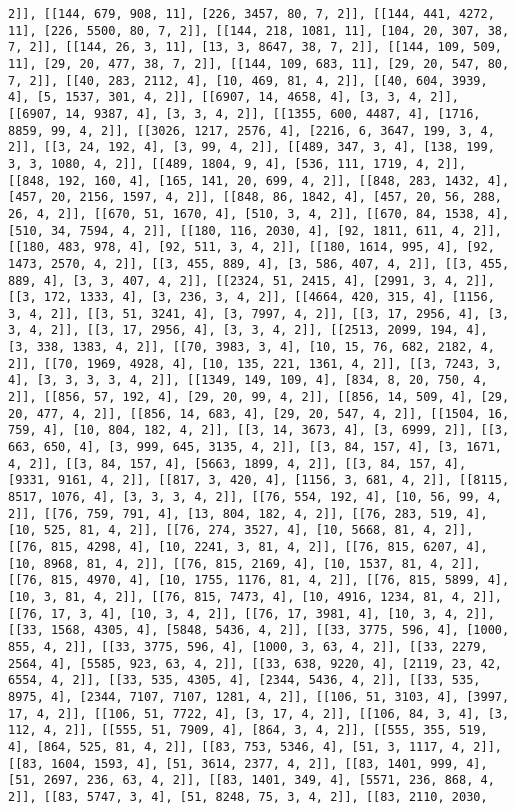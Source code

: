 \documentclass[12pt,fleqn]{article}\usepackage{../../common}
\begin{document}
\begin{verbatim}
2]], [[144, 679, 908, 11], [226, 3457, 80, 7, 2]], [[144, 441, 4272, 11], [226, 5500, 80, 7, 2]], [[144, 218, 1081, 11], [104, 20, 307, 38, 7, 2]], [[144, 26, 3, 11], [13, 3, 8647, 38, 7, 2]], [[144, 109, 509, 11], [29, 20, 477, 38, 7, 2]], [[144, 109, 683, 11], [29, 20, 547, 80, 7, 2]], [[40, 283, 2112, 4], [10, 469, 81, 4, 2]], [[40, 604, 3939, 4], [5, 1537, 301, 4, 2]], [[6907, 14, 4658, 4], [3, 3, 4, 2]], [[6907, 14, 9387, 4], [3, 3, 4, 2]], [[1355, 600, 4487, 4], [1716, 8859, 99, 4, 2]], [[3026, 1217, 2576, 4], [2216, 6, 3647, 199, 3, 4, 2]], [[3, 24, 192, 4], [3, 99, 4, 2]], [[489, 347, 3, 4], [138, 199, 3, 3, 1080, 4, 2]], [[489, 1804, 9, 4], [536, 111, 1719, 4, 2]], [[848, 192, 160, 4], [165, 141, 20, 699, 4, 2]], [[848, 283, 1432, 4], [457, 20, 2156, 1597, 4, 2]], [[848, 86, 1842, 4], [457, 20, 56, 288, 26, 4, 2]], [[670, 51, 1670, 4], [510, 3, 4, 2]], [[670, 84, 1538, 4], [510, 34, 7594, 4, 2]], [[180, 116, 2030, 4], [92, 1811, 611, 4, 2]], [[180, 483, 978, 4], [92, 511, 3, 4, 2]], [[180, 1614, 995, 4], [92, 1473, 2570, 4, 2]], [[3, 455, 889, 4], [3, 586, 407, 4, 2]], [[3, 455, 889, 4], [3, 3, 407, 4, 2]], [[2324, 51, 2415, 4], [2991, 3, 4, 2]], [[3, 172, 1333, 4], [3, 236, 3, 4, 2]], [[4664, 420, 315, 4], [1156, 3, 4, 2]], [[3, 51, 3241, 4], [3, 7997, 4, 2]], [[3, 17, 2956, 4], [3, 3, 4, 2]], [[3, 17, 2956, 4], [3, 3, 4, 2]], [[2513, 2099, 194, 4], [3, 338, 1383, 4, 2]], [[70, 3983, 3, 4], [10, 15, 76, 682, 2182, 4, 2]], [[70, 1969, 4928, 4], [10, 135, 221, 1361, 4, 2]], [[3, 7243, 3, 4], [3, 3, 3, 3, 4, 2]], [[1349, 149, 109, 4], [834, 8, 20, 750, 4, 2]], [[856, 57, 192, 4], [29, 20, 99, 4, 2]], [[856, 14, 509, 4], [29, 20, 477, 4, 2]], [[856, 14, 683, 4], [29, 20, 547, 4, 2]], [[1504, 16, 759, 4], [10, 804, 182, 4, 2]], [[3, 14, 3673, 4], [3, 6999, 2]], [[3, 663, 650, 4], [3, 999, 645, 3135, 4, 2]], [[3, 84, 157, 4], [3, 1671, 4, 2]], [[3, 84, 157, 4], [5663, 1899, 4, 2]], [[3, 84, 157, 4], [9331, 9161, 4, 2]], [[817, 3, 420, 4], [1156, 3, 681, 4, 2]], [[8115, 8517, 1076, 4], [3, 3, 3, 4, 2]], [[76, 554, 192, 4], [10, 56, 99, 4, 2]], [[76, 759, 791, 4], [13, 804, 182, 4, 2]], [[76, 283, 519, 4], [10, 525, 81, 4, 2]], [[76, 274, 3527, 4], [10, 5668, 81, 4, 2]], [[76, 815, 4298, 4], [10, 2241, 3, 81, 4, 2]], [[76, 815, 6207, 4], [10, 8968, 81, 4, 2]], [[76, 815, 2169, 4], [10, 1537, 81, 4, 2]], [[76, 815, 4970, 4], [10, 1755, 1176, 81, 4, 2]], [[76, 815, 5899, 4], [10, 3, 81, 4, 2]], [[76, 815, 7473, 4], [10, 4916, 1234, 81, 4, 2]], [[76, 17, 3, 4], [10, 3, 4, 2]], [[76, 17, 3981, 4], [10, 3, 4, 2]], [[33, 1568, 4305, 4], [5848, 5436, 4, 2]], [[33, 3775, 596, 4], [1000, 855, 4, 2]], [[33, 3775, 596, 4], [1000, 3, 63, 4, 2]], [[33, 2279, 2564, 4], [5585, 923, 63, 4, 2]], [[33, 638, 9220, 4], [2119, 23, 42, 6554, 4, 2]], [[33, 535, 4305, 4], [2344, 5436, 4, 2]], [[33, 535, 8975, 4], [2344, 7107, 7107, 1281, 4, 2]], [[106, 51, 3103, 4], [3997, 17, 4, 2]], [[106, 51, 7722, 4], [3, 17, 4, 2]], [[106, 84, 3, 4], [3, 112, 4, 2]], [[555, 51, 7909, 4], [864, 3, 4, 2]], [[555, 355, 519, 4], [864, 525, 81, 4, 2]], [[83, 753, 5346, 4], [51, 3, 1117, 4, 2]], [[83, 1604, 1593, 4], [51, 3614, 2377, 4, 2]], [[83, 1401, 999, 4], [51, 2697, 236, 63, 4, 2]], [[83, 1401, 349, 4], [5571, 236, 868, 4, 2]], [[83, 5747, 3, 4], [51, 8248, 75, 3, 4, 2]], [[83, 2110, 2030, 
\end{verbatim}
\end{document}
